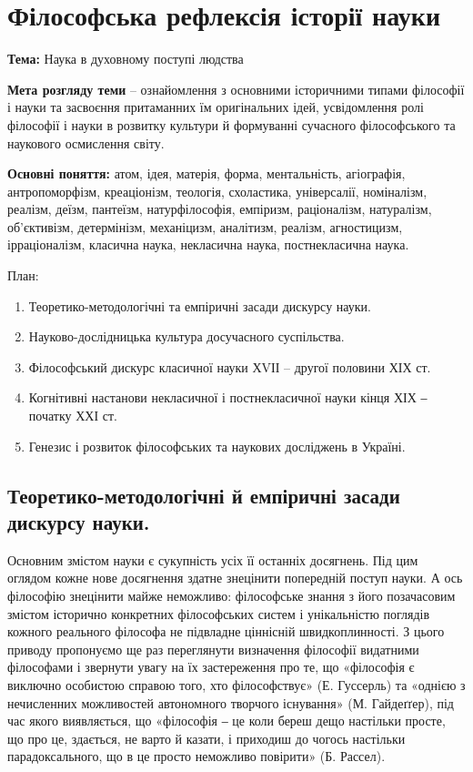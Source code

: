 \section{Філософська рефлексія історії науки}

\textbf{Тема:} Наука в духовному поступі людства

\textbf{Мета розгляду теми} – ознайомлення з основними історичними типами
філософії і науки та засвоєння притаманних їм оригінальних ідей, усвідомлення
ролі філософії і науки в розвитку культури й формуванні сучасного
філософського та наукового осмислення світу.

\textbf{Основні поняття:} атом, ідея, матерія, форма, ментальність, агіографія,
антропоморфізм, креаціонізм, теологія, схоластика, універсалії, номіналізм,
реалізм, деїзм, пантеїзм, натурфілософія, емпіризм, раціоналізм, натуралізм,
об’єктивізм, детермінізм, механіцизм, аналітизм, реалізм, агностицизм,
ірраціоналізм, класична наука, некласична наука, постнекласична наука.

План:
\begin{enumerate}
	\item Теоретико-методологічні та емпіричні засади дискурсу науки.
	
	\item Науково-дослідницька культура досучасного суспільства.

	\item Філософський дискурс класичної науки ХVІІ – другої половини ХІХ ст.

	\item Когнітивні настанови некласичної і постнекласичної науки кінця ХІХ ‒
	початку ХХІ ст.

	\item Генезис і розвиток філософських та наукових досліджень в Україні.
\end{enumerate}

\subsection{Теоретико-методологічні й емпіричні засади дискурсу науки.}
Основним змістом науки є сукупність усіх її останніх досягнень. Під цим
оглядом кожне нове досягнення здатне знецінити попередній поступ науки. А
ось філософію знецінити майже неможливо: філософське знання з його
позачасовим змістом історично конкретних філософських систем і
унікальністю поглядів кожного реального філософа не підвладне ціннісній
швидкоплинності. З цього приводу пропонуємо ще раз переглянути визначення
філософії видатними філософами і звернути увагу на їх застереження про те,
що «філософія є виключно особистою справою того, хто філософствує» (Е.
Гуссерль) та «однією з нечисленних можливостей автономного творчого
існування» (М. Гайдеґґер), під час якого виявляється, що «філософія ‒ це коли
береш дещо настільки просте, що про це, здається, не варто й казати, і
приходиш до чогось настільки парадоксального, що в це просто неможливо
повірити» (Б. Рассел).

